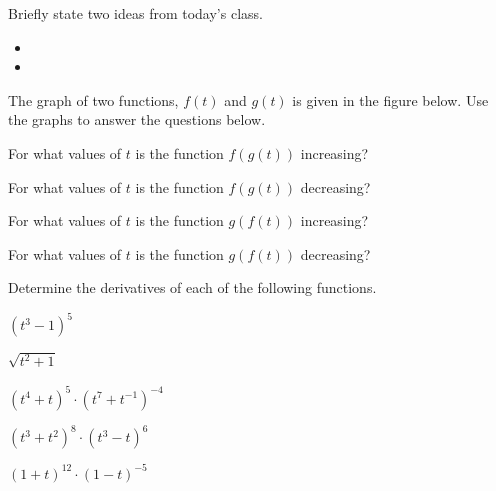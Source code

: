 \postClass

\begin{problem}
\item Briefly state two ideas from today's class.
  \begin{itemize}
  \item
  \item
  \end{itemize}
  \item The graph of two functions, $f(t)$ and $g(t)$ is given in the
    figure below. Use the graphs to answer the questions below.

    \scalebox{0.75}{}

    \begin{subproblem}
    \item For what values of $t$ is the function $f(g(t))$ increasing?
      \vfill
    \item For what values of $t$ is the function $f(g(t))$ decreasing?
      \vfill
    \item For what values of $t$ is the function $g(f(t))$ increasing?
      \vfill
    \item For what values of $t$ is the function $g(f(t))$ decreasing?
      \vfill
    \end{subproblem}

\clearpage

\item Determine the derivatives of each of the following functions.
  \begin{subproblem}
  \item $(t^3-1)^5$
    \vfill
  \item $\sqrt{t^2+1}$
    \vfill
  \item $(t^4+t)^5\cdot (t^7+t^{-1})^{-4}$
    \vfill
  \item $(t^3+t^2)^8\cdot (t^3-t)^6$
    \vfill
  \item $(1+t)^{12}\cdot (1-t)^{-5}$
    \vfill
  \end{subproblem}
\end{problem}






